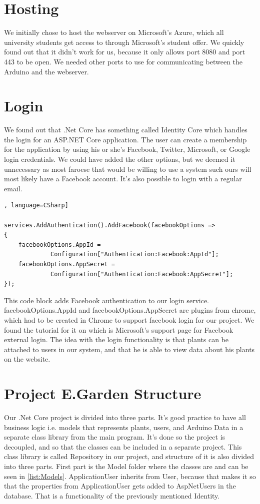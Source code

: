 \documentclass[a4paper,12pt,twoside,openright,titlepage]{book}
\begin{document}
\section{Hosting}
We initially chose to host the webserver on Microsoft's Azure, which all university students get access to through Microsoft's student offer. We quickly found out that it didn't work for us, because it only allows port 8080 and port 443 to be open. We needed other ports to use for communicating between the Arduino and the webserver.

\section{Login}
We found out that .Net Core has something called Identity Core\cite{Identity} which handles the login for an ASP.NET Core application. The user can create a membership for the application by using his or she's  Facebook, Twitter, Microsoft, or Google login credentials. We could have added the other options, but we deemed it unnecessary as most faroese that would be willing to use a system such ours will most likely have a Facebook account. It's also possible to login with a regular email.

\begin{lstlisting}, language=CSharp] 

services.AddAuthentication().AddFacebook(facebookOptions =>
{
	facebookOptions.AppId =
			 Configuration["Authentication:Facebook:AppId"];
	facebookOptions.AppSecret =
			 Configuration["Authentication:Facebook:AppSecret"];
});
\end{lstlisting}

This code block adds Facebook authentication to our login service. facebookOptions.AppId and facebookOptions.AppSecret are plugins from chrome, which had to be created in Chrome to support facebook login for our project. We found the tutorial for it on \cite{FacebookLogin} which is Microsoft's support page for Facebook external login. The idea with the login functionality is that plants can be attached to users in our system, and that he is able to view data about his plants on the website.

\section{Project E.Garden Structure}
Our .Net Core project is divided into three parts. It's good practice to have all business logic i.e. models that represents plants, users, and Arduino Data in a separate class library from the main program. It's done so the project is decoupled, and so that the classes can be included in a separate project. This class library is called Repository in our project, and structure of it is also divided into three parts. First part is the Model folder where the classes are and can be seen in \ref{list:Models}. ApplicationUser inherits from User, because that makes it so that the properties from ApplicationUser gets added to AspNetUsers in the database. That is a functionality of the previously mentioned Identity. 
\end{document}

